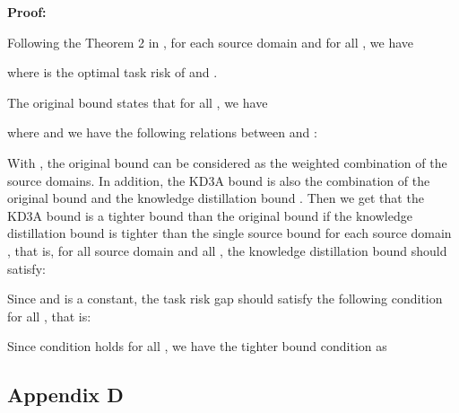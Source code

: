 \documentclass{article}
\begin{document}
\textbf{Proof:}

Following the Theorem 2 in \citet{DBLP:journals/ml/Ben-DavidBCKPV10}, for each source domain  and for all , we have

where  is the optimal task risk of  and .

The original bound states that for all , we have

where  and we have the following relations between  and :


With , the original bound  can be considered as the weighted combination of the source domains. In addition, the KD3A bound is also the combination of the original bound  and the knowledge distillation bound . Then we get that the KD3A bound is a tighter bound than the original bound if the knowledge distillation bound  is tighter than the single source bound  for each source domain , that is, for all source domain  and all , the knowledge distillation bound should satisfy:

Since  and  is a constant, the task risk gap  should satisfy the following condition for all , that is:

Since condition  holds for all , we have the tighter bound condition as 

\subsection{Appendix D}
\end{document}
